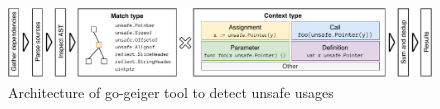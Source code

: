 \begin{figure}[htp!]
    \centering
    \includegraphics[width=\textwidth]{assets/figures/go-geiger-architecture.pdf}
    \caption{Architecture of go-geiger tool to detect unsafe usages}
    \label{fig:geiger-architecture}
\end{figure}

